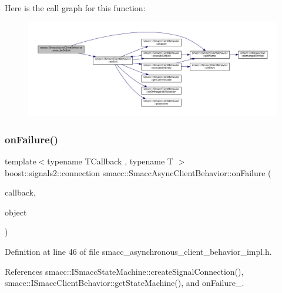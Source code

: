 Here is the call graph for this function\+:
\nopagebreak
\begin{figure}[H]
\begin{center}
\leavevmode
\includegraphics[width=350pt]{classsmacc_1_1SmaccAsyncClientBehavior_a3d982d370df4f133ad37c0b2370e9b82_cgraph}
\end{center}
\end{figure}
\mbox{\label{classsmacc_1_1SmaccAsyncClientBehavior_a34d7ba8f590393e4cd7d2f742f04189a}} 
\subsubsection{\texorpdfstring{on\+Failure()}{onFailure()}}
{\footnotesize\ttfamily template$<$typename T\+Callback , typename T $>$ \\
boost\+::signals2\+::connection smacc\+::\+Smacc\+Async\+Client\+Behavior\+::on\+Failure (\begin{DoxyParamCaption}\item[{T\+Callback}]{callback,  }\item[{T $\ast$}]{object }\end{DoxyParamCaption})}



Definition at line 46 of file smacc\+\_\+asynchronous\+\_\+client\+\_\+behavior\+\_\+impl.\+h.



References smacc\+::\+I\+Smacc\+State\+Machine\+::create\+Signal\+Connection(), smacc\+::\+I\+Smacc\+Client\+Behavior\+::get\+State\+Machine(), and on\+Failure\+\_\+.


